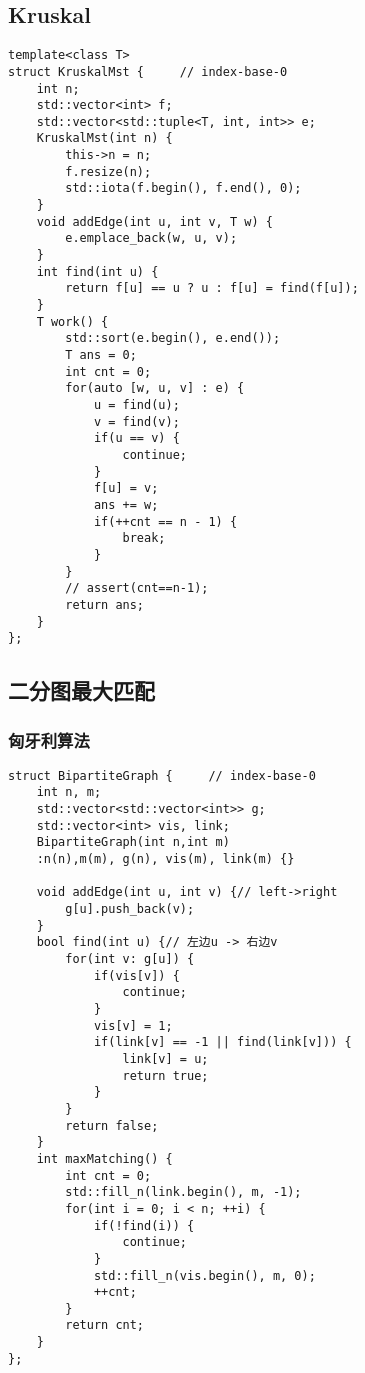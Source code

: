 \subsection{Kruskal}
\begin{lstlisting}
template<class T>
struct KruskalMst {		// index-base-0
    int n;
    std::vector<int> f;
    std::vector<std::tuple<T, int, int>> e;
    KruskalMst(int n) {
		this->n = n;
		f.resize(n);
		std::iota(f.begin(), f.end(), 0);
	}
    void addEdge(int u, int v, T w) {
        e.emplace_back(w, u, v);
    }
    int find(int u) {
        return f[u] == u ? u : f[u] = find(f[u]);
    }
    T work() {
        std::sort(e.begin(), e.end());
        T ans = 0;
        int cnt = 0;
		for(auto [w, u, v] : e) {
			u = find(u);
			v = find(v);
			if(u == v) {
				continue;
			}
			f[u] = v;
			ans += w;
			if(++cnt == n - 1) {
				break;
			}
		}
        // assert(cnt==n-1);
        return ans;
    }
};
\end{lstlisting}


\subsection{二分图最大匹配}
\subsubsection{匈牙利算法}
\begin{lstlisting}
struct BipartiteGraph {		// index-base-0
    int n, m;
    std::vector<std::vector<int>> g;
    std::vector<int> vis, link;
    BipartiteGraph(int n,int m)
	:n(n),m(m), g(n), vis(m), link(m) {}

    void addEdge(int u, int v) {// left->right
        g[u].push_back(v);
    }
    bool find(int u) {// 左边u -> 右边v
        for(int v: g[u]) {
            if(vis[v]) {
				continue;
			}
            vis[v] = 1;
            if(link[v] == -1 || find(link[v])) {
                link[v] = u;
                return true;
            }
        }
        return false;
    }
    int maxMatching() {
        int cnt = 0;
        std::fill_n(link.begin(), m, -1);
        for(int i = 0; i < n; ++i) {
            if(!find(i)) {
				continue;
			}
            std::fill_n(vis.begin(), m, 0);
            ++cnt;
        }
        return cnt;
    }
};
\end{lstlisting}


